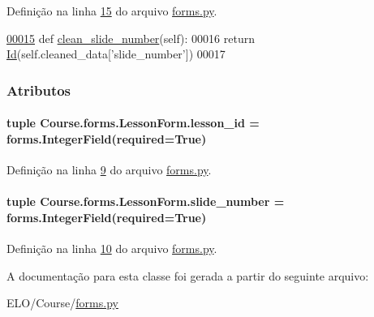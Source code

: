Definição na linha \hyperlink{Course_2forms_8py_source_l00015}{15} do arquivo \hyperlink{Course_2forms_8py_source}{forms.\+py}.


\begin{DoxyCode}
\hypertarget{classCourse_1_1forms_1_1LessonForm_l00015}{}\hyperlink{classCourse_1_1forms_1_1LessonForm_ae1d45c4578bfd73ae6b0f0b3f52ce8da}{00015}     \textcolor{keyword}{def }\hyperlink{classCourse_1_1forms_1_1LessonForm_ae1d45c4578bfd73ae6b0f0b3f52ce8da}{clean\_slide\_number}(self):
00016         \textcolor{keywordflow}{return} \hyperlink{classELO_1_1BaseUnit_1_1Id}{Id}(self.cleaned\_data[\textcolor{stringliteral}{'slide\_number'}])
00017 
\end{DoxyCode}


\subsubsection{Atributos}
\hypertarget{classCourse_1_1forms_1_1LessonForm_a0ed8ca8dc81ac7498c83df4a5735ce04}{}
\paragraph[{lesson\+\_\+id}]{\setlength{\rightskip}{0pt plus 5cm}tuple Course.\+forms.\+Lesson\+Form.\+lesson\+\_\+id = forms.\+Integer\+Field(required=True)\hspace{0.3cm}{\ttfamily [static]}}\label{classCourse_1_1forms_1_1LessonForm_a0ed8ca8dc81ac7498c83df4a5735ce04}


Definição na linha \hyperlink{Course_2forms_8py_source_l00009}{9} do arquivo \hyperlink{Course_2forms_8py_source}{forms.\+py}.

\hypertarget{classCourse_1_1forms_1_1LessonForm_ad030e96bd25bff769cce537955b318d1}{}
\paragraph[{slide\+\_\+number}]{\setlength{\rightskip}{0pt plus 5cm}tuple Course.\+forms.\+Lesson\+Form.\+slide\+\_\+number = forms.\+Integer\+Field(required=True)\hspace{0.3cm}{\ttfamily [static]}}\label{classCourse_1_1forms_1_1LessonForm_ad030e96bd25bff769cce537955b318d1}


Definição na linha \hyperlink{Course_2forms_8py_source_l00010}{10} do arquivo \hyperlink{Course_2forms_8py_source}{forms.\+py}.



A documentação para esta classe foi gerada a partir do seguinte arquivo\+:\begin{DoxyCompactItemize}
\item 
E\+L\+O/\+Course/\hyperlink{Course_2forms_8py}{forms.\+py}\end{DoxyCompactItemize}
